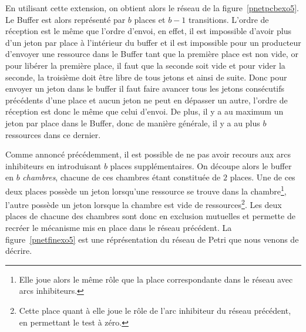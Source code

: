 En utilisant cette extension, on obtient alors le réseau de la figure~\ref{pnetpcbexo5}. Le Buffer
est alors représenté par $b$ places et $b-1$ transitions. L'ordre de réception est le même que
l'ordre d'envoi, en effet, il est impossible d'avoir plus d'un jeton par place à l'intérieur du
buffer et il est impossible pour un producteur d'envoyer une ressource dans le Buffer tant que la
première place est non vide, or pour libérer la première place, il faut que la seconde soit vide et
pour vider la seconde, la troisième doit être libre de tous jetons et ainsi de suite. Donc pour
envoyer un jeton dans le buffer il faut faire avancer tous les jetons consécutifs précédents d'une
place et aucun jeton ne peut en dépasser un autre, l'ordre de réception est donc le même que celui
d'envoi. De plus, il y a au maximum un jeton par place dans le Buffer, donc de manière générale, il
y a au plus $b$ ressources dans ce dernier.

Comme annoncé précédemment, il est possible de ne pas avoir recours aux arcs inhibiteurs en
introduisant $b$ places supplémentaires. On découpe alors le buffer en $b$ \emph{chambres}, chacune
de ces chambres étant constituée de $2$ places. Une de ces deux places possède un jeton lorsqu'une
ressource se trouve dans la chambre\footnote{Elle joue alors le même rôle que la place
correspondante dans le réseau avec arcs inhibiteurs.}, l'autre possède un jeton lorsque la chambre
est vide de ressources\footnote{Cette place quant à elle joue le rôle de l'arc inhibiteur du réseau
précédent, en permettant le test à zéro.}. Les deux places de chacune des chambres sont donc en
exclusion mutuelles et permette de recréer le mécanisme mis en place dans le réseau précédent. La
figure~\ref{pnetfinexo5} est une réprésentation du réseau de Petri que nous venons de décrire.
